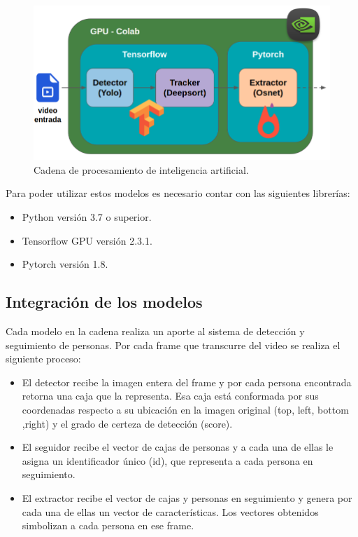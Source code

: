 \begin{figure}[ht]
	\centering
	\includegraphics[scale=.50]{./Figures/cadenaProcesamiento.png}
	\caption{Cadena de procesamiento de inteligencia artificial.}
	\label{fig:cadenaProcesamiento}
\end{figure}

Para poder utilizar estos modelos es necesario contar con las siguientes librerías:
\begin{itemize}
\item Python versión 3.7 o superior.
\item Tensorflow GPU versión 2.3.1.
\item Pytorch versión 1.8.
\end{itemize}


\subsection{Integración de los modelos}

Cada modelo en la cadena realiza un aporte al sistema de detección y seguimiento de personas. Por cada frame que transcurre del video se realiza el siguiente proceso:

\begin{itemize}
\item El detector recibe la imagen entera del frame y por cada persona encontrada retorna una caja que la representa. Esa caja está conformada por sus coordenadas respecto a su ubicación en la imagen original (top, left, bottom ,right) y el grado de certeza de detección (score).
\item El seguidor recibe  el vector de cajas de personas y a cada una de ellas le asigna un identificador único (id), que representa a cada persona en seguimiento.
\item El extractor recibe el vector de cajas y personas en seguimiento y genera por cada una de ellas un vector de características. Los vectores obtenidos simbolizan a cada persona en ese frame.
\end{itemize}


